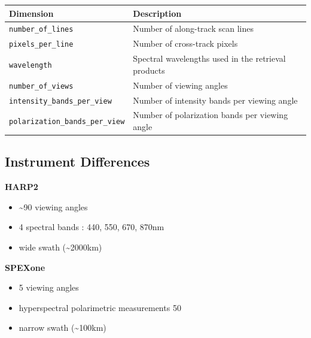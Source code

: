 \documentclass[
  11pt,
  letterpaper,
]{scrreprt}
\providecommand{\tightlist}{%
  \setlength{\itemsep}{0pt}\setlength{\parskip}{0pt}}
\begin{document}
\begin{longtable}[]{@{}
  >{\raggedright\arraybackslash}p{}
  >{\raggedright\arraybackslash}p{}@{}}
\toprule\noalign{}
\begin{minipage}[b]{\linewidth}\raggedright
Dimension
\end{minipage} & \begin{minipage}[b]{\linewidth}\raggedright
Description
\end{minipage} \\
\midrule\noalign{}
\endhead
\bottomrule\noalign{}
\endlastfoot
\texttt{number\_of\_lines} & Number of along-track scan lines \\
\texttt{pixels\_per\_line} & Number of cross-track pixels \\
\texttt{wavelength} & Spectral wavelengths used in the retrieval
products \\
\texttt{number\_of\_views} & Number of viewing angles \\
\texttt{intensity\_bands\_per\_view} & Number of intensity bands per
viewing angle \\
\texttt{polarization\_bands\_per\_view} & Number of polarization bands
per viewing angle \\
\end{longtable}

\subsection{Instrument Differences}\label{instrument-differences}

\textbf{HARP2}

\begin{itemize}
\tightlist
\item
  \textasciitilde90 viewing angles\\
\item
  4 spectral bands : 440, 550, 670, 870nm
\item
  wide swath (\textasciitilde2000km)
\end{itemize}

\textbf{SPEXone}

\begin{itemize}
\tightlist
\item
  5 viewing angles\\
\item
  hyperspectral polarimetric measurements 50
\item
  narrow swath (\textasciitilde100km)
\end{itemize}
\end{document}

